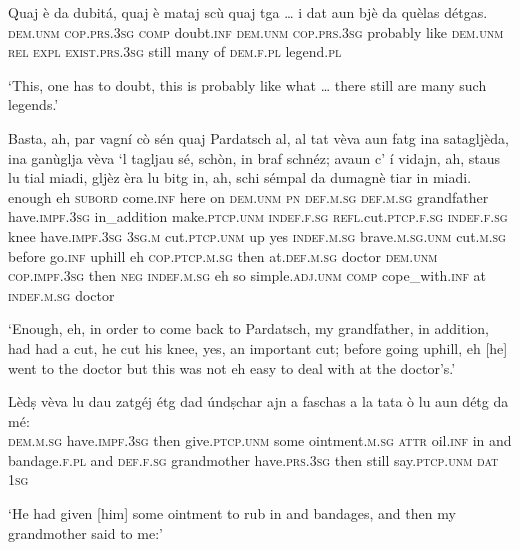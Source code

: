 \begin{linenumbers}
\gll  Quaj è da dubitá, quaj è mataj scù quaj tga … i dat aun bjè da quèlas détgas.  \\
 \textsc{dem.unm}  \textsc{cop.prs.3sg} \textsc{comp} doubt.\textsc{inf} \textsc{dem.unm} \textsc{cop.prs.3sg} probably like \textsc{dem.unm} \textsc{rel} {} \textsc{expl} \textsc{exist.prs.3sg} still many of \textsc{dem.f.pl} legend.\textsc{pl} \\
\end{linenumbers}
\medskip
\glt `This, one has to doubt, this is probably like what … there still are many such legends.'
\medskip

\begin{linenumbers}
\gll   Basta, ah, par vagní cò sén quaj Pardatsch al, al tat vèva aun fatg ina satagljèda, ina ganùglja vèva `l tagljau sé, schòn, in braf schnéz; avaun c’ í vidajn, ah, staus lu tial miadi, gljèz èra lu bitg in, ah, schi sémpal da dumagnè tiar in miadi. \\
enough eh \textsc{subord} come.\textsc{inf} here on \textsc{dem.unm} \textsc{pn} \textsc{def.m.sg} \textsc{def.m.sg} grandfather have.\textsc{impf.3sg} in\_addition make.\textsc{ptcp.unm} \textsc{indef.f.sg} \textsc{refl.}cut.\textsc{ptcp.f.sg} \textsc{indef.f.sg} knee have.\textsc{impf.3sg} \textsc{3sg.m} cut.\textsc{ptcp.unm} up yes \textsc{indef.m.sg} brave.\textsc{m.sg.unm} cut.\textsc{m.sg} before \textsc{} go.\textsc{inf} uphill eh \textsc{cop.ptcp.m.sg} then  at.\textsc{def.m.sg} doctor \textsc{dem.unm} \textsc{cop.impf.3sg} then \textsc{neg} \textsc{indef.m.sg} eh so simple.\textsc{adj.unm} \textsc{comp} cope\_with.\textsc{inf} at \textsc{indef.m.sg} doctor\\
\end{linenumbers}
\medskip
\glt `Enough, eh, in order to come back to Pardatsch, my grandfather, in addition, had had a cut, he cut his knee, yes, an important cut; before going uphill, eh [he] went to the doctor but this was not eh easy to deal with at the doctor’s.'
\medskip

\begin{linenumbers}
\gll  Lèdṣ vèva lu dau zatgéj étg dad úndṣchar ajn a faschas a la tata ò lu aun détg da mé:  \\
 \textsc{dem.m.sg} have.\textsc{impf.3sg} then  give.\textsc{ptcp.unm} some ointment.\textsc{m.sg} \textsc{attr} oil.\textsc{inf} in and bandage.\textsc{f.pl} and \textsc{def.f.sg} grandmother have.\textsc{prs.3sg} then still say.\textsc{ptcp.unm} \textsc{dat} \textsc{1sg}  \\
\end{linenumbers}
\medskip
\glt `He had given [him] some ointment to rub in and bandages, and then my grandmother said to me:'
\medskip

